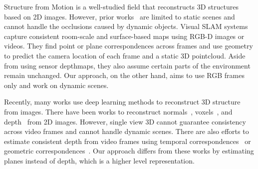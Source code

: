 

Structure from Motion is a well-studied field that reconstructs 3D structures based on 2D images. 
However, prior works~\cite{sinha2010multi, dani2011single, whelan2015elasticfusion, tamaazousti2011nonlinear, schonberger2016structure, schwarz1978estimating, ozden2010multibody} are limited to static scenes and cannot handle the occlusions caused by dynamic objects. 
Visual SLAM systems~\cite{whelan2015elasticfusion, raposo2016pi, raposo2013plane} capture consistent room-scale and surface-based maps using RGB-D images or videos. They find point or plane correspondences across frames and use geometry to predict the camera location of each frame and a static 3D pointcloud. Aside from using sensor depthmaps, they also assume certain parts of the environment remain unchanged. Our approach, on the other hand, aims to use RGB frames only and work on dynamic scenes.


Recently, many works use deep learning methods to reconstruct 3D structure from images. There have been works to reconstruct normals~\cite{Eigen15,Wang15}, voxels~\cite{Choy20163d,Girdhar16b}, and depth~\cite{Eigen15,Ranftl2020} from 2D images. However, single view 3D cannot guarantee consistency across video frames and cannot handle dynamic scenes. There are also efforts to estimate consistent depth from video frames using temporal correspondences~\cite{karsch2014depth, patil2020don, wang2019recurrent, zhang2019exploiting} or geometric correspondences~\cite{Luo-VideoDepth-2020}. Our approach differs from these works by estimating planes instead of depth, which is a higher level representation. 

